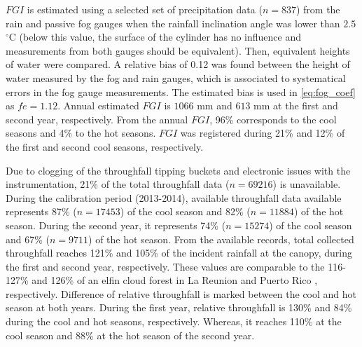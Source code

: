 \documentclass[a4paper,12pt]{article}
\begin{document}
$FGI$ is estimated using a selected set of precipitation data ($n=837$) from the rain and passive fog gauges when the rainfall inclination angle was lower than $2.5$ $\mathrm{^{\circ}C}$ (below this value, the surface of the cylinder has no influence and measurements from both gauges should be equivalent). Then, equivalent heights of water were compared. A relative bias of 0.12 was found between the height of water measured by the fog and rain gauges, which is associated to systematical errors in the fog gauge measurements. The estimated bias is used in \autoref{eq:fog_coef} as $fe=1.12$. Annual estimated $FGI$ is $1066$ $\mathrm{{mm}}$ and $613$ $\mathrm{{mm}}$ at the first and second year, respectively. From the annual $FGI$, 96\% corresponds to the cool seasons and 4\% to the hot seasons. $FGI$ was registered during 21\% and 12\% of the first and second cool seasons, respectively.
 
Due to clogging of the throughfall tipping buckets and electronic issues with the instrumentation, 21\% of the total throughfall data ($n=69216$) is unavailable. During the calibration period (2013-2014), available throughfall data available represents 87\% ($n=17453$) of the cool season and 82\% ($n=11884$) of the hot season. During the second year, it represents 74\% ($n=15274$) of the cool season and 67\% ($n=9711$) of the hot season. From the available records, total collected throughfall reaches 121\% and 105\% of the incident rainfall at the canopy, during the first and second year, respectively. These values are comparable to the 116-127\% and 126\% of an elfin cloud forest in La Reunion \citep{Gabrieletal2008} and Puerto Rico \citep{Holwerdaetal2006}, respectively. Difference of relative throughfall is marked between the cool and hot season at both years. During the first year, relative throughfall is 130\% and 84\% during the cool and hot seasons, respectively. Whereas, it reaches 110\% at the cool season and 88\% at the hot season of the second year. 
\end{document}
